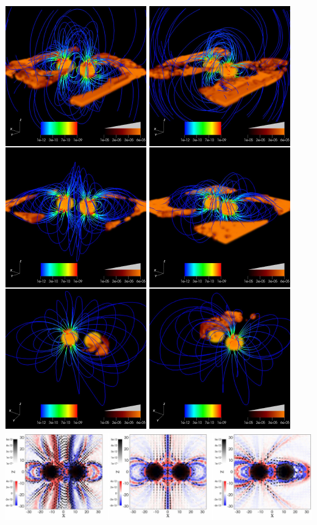 \begin{frame}
\begin{columns}
\begin{column}{7.5cm}
        \includegraphics[width=\columnwidth,clip=true,trim=0 4cm 0 4cm]{figs/plots/mpc/plot_Bxi}
        \\
        \includegraphics[width=\columnwidth]{figs/plots/mpc/plot_current}
        \\

\end{column}
\end{columns}
\end{frame}
